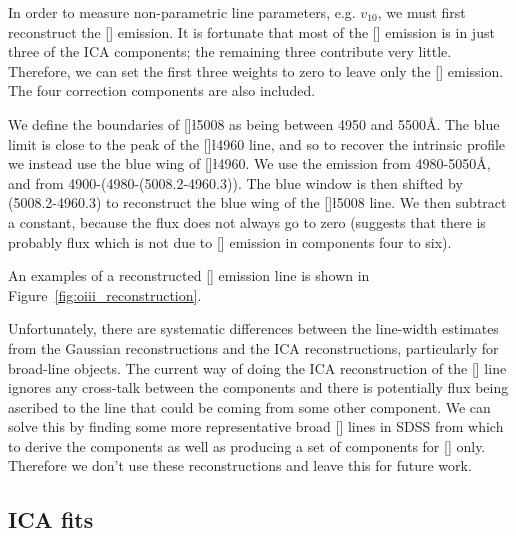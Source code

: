 In order to measure non-parametric line parameters, e.g. $v_{10}$, we must first reconstruct the [] emission. 
It is fortunate that most of the [] emission is in just three of the ICA components; the remaining three contribute very little. 
Therefore, we can set the first three weights to zero to leave only the [] emission. 
The four correction components are also included. 

We define the boundaries of []\l5008 as being between 4950 and 5500\AA. 
The blue limit is close to the peak of the []\l4960 line, and so to recover the intrinsic profile we instead use the blue wing of []\l4960. 
We use the emission from 4980-5050\AA, and from 4900-(4980-(5008.2-4960.3)). 
The blue window is then shifted by (5008.2-4960.3) to reconstruct the blue wing of the []\l5008 line. 
We then subtract a constant, because the flux does not always go to zero (suggests that there is probably flux which is not due to [] emission in components four to six). 

An examples of a reconstructed [] emission line is shown in Figure~\ref{fig:oiii_reconstruction}. 

Unfortunately, there are systematic differences between the line-width estimates from the Gaussian reconstructions and the ICA reconstructions, particularly for broad-line objects.
The current way of doing the ICA reconstruction of the [] line ignores any cross-talk between the components and there is potentially flux being ascribed to the line that could be coming from some other component. 
We can solve this by finding some more representative broad [] lines in SDSS from which to derive the components as well as producing a set of components for [] only.
Therefore we don't use these reconstructions and leave this for future work. 

\subsection{ICA fits}

